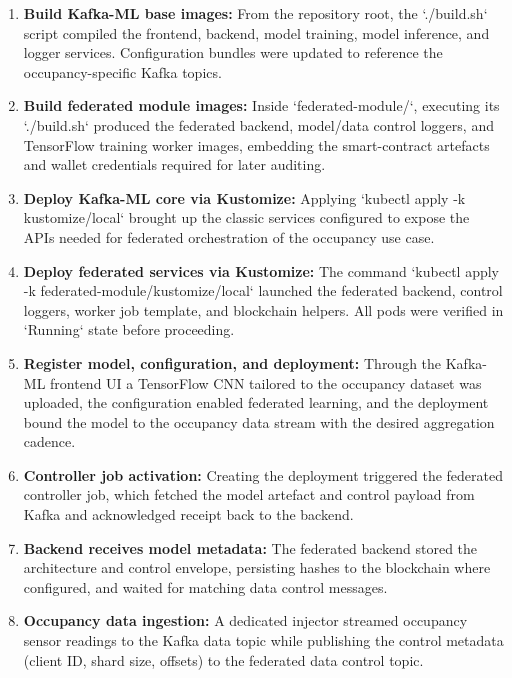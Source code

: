 \begin{enumerate}
    \item \textbf{Build Kafka-ML base images:} From the repository root, the `./build.sh` script compiled the frontend, backend, model training, model inference, and logger services. Configuration bundles were updated to reference the occupancy-specific Kafka topics.

    \item \textbf{Build federated module images:} Inside `federated-module/`, executing its `./build.sh` produced the federated backend, model/data control loggers, and TensorFlow training worker images, embedding the smart-contract artefacts and wallet credentials required for later auditing.

    \item \textbf{Deploy Kafka-ML core via Kustomize:} Applying `kubectl apply -k kustomize/local` brought up the classic services configured to expose the APIs needed for federated orchestration of the occupancy use case.

    \item \textbf{Deploy federated services via Kustomize:} The command `kubectl apply -k federated-module/kustomize/local` launched the federated backend, control loggers, worker job template, and blockchain helpers. All pods were verified in `Running` state before proceeding.

    \item \textbf{Register model, configuration, and deployment:} Through the Kafka-ML frontend UI a TensorFlow CNN tailored to the occupancy dataset was uploaded, the configuration enabled federated learning, and the deployment bound the model to the occupancy data stream with the desired aggregation cadence.

    \item \textbf{Controller job activation:} Creating the deployment triggered the federated controller job, which fetched the model artefact and control payload from Kafka and acknowledged receipt back to the backend.

    \item \textbf{Backend receives model metadata:} The federated backend stored the architecture and control envelope, persisting hashes to the blockchain where configured, and waited for matching data control messages.

    \item \textbf{Occupancy data ingestion:} A dedicated injector streamed occupancy sensor readings to the Kafka data topic while publishing the control metadata (client ID, shard size, offsets) to the federated data control topic.


\end{enumerate}
